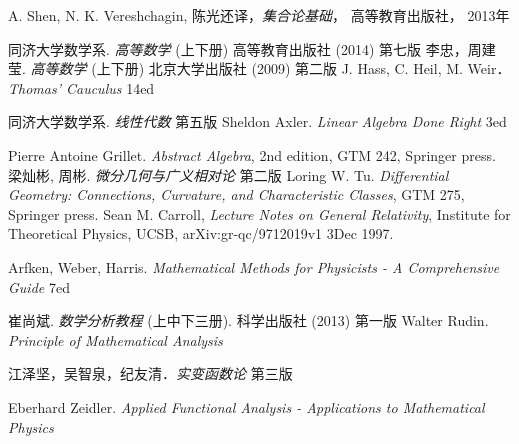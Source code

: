\begin{thebibliography}{99}
A. Shen, N. K. Vereshchagin, 陈光还译，\textsl{集合论基础}， 高等教育出版社， 2013年

同济大学数学系. \textsl{高等数学} (上下册) 高等教育出版社 (2014) 第七版
李忠，周建莹. \textsl{高等数学} (上下册) 北京大学出版社 (2009) 第二版
J. Hass, C. Heil, M. Weir．\textsl{Thomas' Cauculus} 14ed

同济大学数学系. \textsl{线性代数} 第五版
Sheldon Axler. \textsl{Linear Algebra Done Right} 3ed

Pierre Antoine Grillet. \textsl{Abstract Algebra}, 2nd edition, GTM 242, Springer press. 
梁灿彬, 周彬. \textsl{微分几何与广义相对论} 第二版
Loring W. Tu. \textsl{Differential Geometry: Connections, Curvature, and Characteristic Classes}, GTM 275, Springer press. 
Sean M. Carroll, \textsl{Lecture Notes on General Relativity}, Institute for Theoretical Physics, UCSB, arXiv:gr-qc/9712019v1 3Dec 1997. 

Arfken, Weber, Harris. \textsl{Mathematical Methods for Physicists - A Comprehensive Guide} 7ed

崔尚斌. \textsl{数学分析教程} (上中下三册). 科学出版社 (2013) 第一版
Walter Rudin. \textsl{Principle of Mathematical Analysis}

江泽坚，吴智泉，纪友清．\textsl{实变函数论} 第三版

Eberhard Zeidler. \textsl{Applied Functional Analysis - Applications to Mathematical Physics}


\end{thebibliography}
